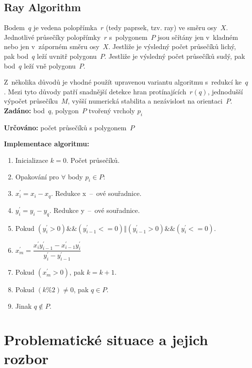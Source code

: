 \documentclass[a4paper, 12pt, oneside, titlepage]{article} %
\begin{document}
\subsection{Ray Algorithm} \label{RA}
Bodem~$q$ je vedena polopřímka~$r$ (tedy paprsek, tzv. ray) ve směru osy~$X$. Jednotlivé průsečíky polopřímky~$r$ s~polygonem~$P$ jsou sčítány jen v~kladném nebo jen v~záporném směru osy~$X$. Jestliže je výsledný počet průsečíků lichý, pak bod~$q$ leží uvnitř polygonu~$P$. Jestliže je výsledný počet průsečíků sudý, pak bod~$q$ leží vně polygonu~$P$. 

Z~několika důvodů je vhodné použít upravenou variantu algoritmu s~redukcí ke~$q$. Mezi tyto důvody patří snadnější detekce hran protínajících~$r(q)$, jednodušší výpočet průsečíku~$M$, vyšší numerická stabilita a nezávislost na orientaci~$P$.\\

\noindent\textbf{Zadáno:} bod~$q$, polygon~$P$ tvořený vrcholy $p_i$

\noindent\textbf{Určováno:} počet průsečíků s polygonem~$P$

\noindent\textbf{Implementace algoritmu:}


\begin{enumerate}
  \item Inicializace $k = 0$. Počet průsečíků.
  \item Opakování pro $\forall$ body $p_i \in P$:
  \item \qquad $x^{'}_{i} = x_i - x_q$. Redukce x~--~ové souřadnice.
  \item \qquad $y^{'}_{i} = y_i - y_q$. Redukce y~--~ové souřadnice.
  \item \qquad Pokud $(y^{'}_{i} > 0)\&\&(y^{'}_{i-1} <= 0)\Vert(y^{'}_{i-1} > 0)\&\&(y^{'}_{i} <= 0)$.
  \item \qquad \qquad $x^{'}_{m} = \dfrac{x^{'}_{i} y^{'}_{i-1} - x^{'}_{i-1} y^{'}_{i}}{y^{'}_{i}-y^{'}_{i-1}}$
  \item \qquad \qquad Pokud $(x^{'}_{m} > 0)$, pak $k = k+1$.
  \item Pokud $(k\%2) \neq 0$, pak $q \in P$.
  \item Jinak $q \notin P$.
\end{enumerate}



\section{Problematické situace a jejich rozbor}
\end{document}
